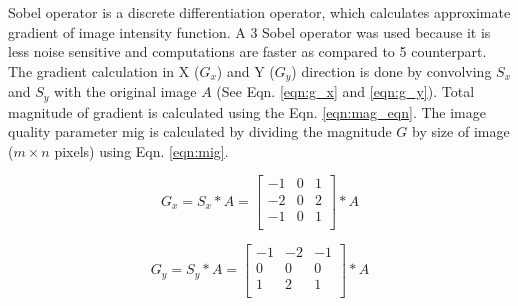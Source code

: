             \vspace{5mm}
            \noindent Sobel operator is a discrete differentiation operator, which calculates approximate gradient of image intensity function. A 3  Sobel operator was used because it is less noise sensitive and computations are faster as compared to 5  counterpart. The gradient calculation in X ($G_x$) and Y ($G_y$) direction is done by convolving $S_x$ and $S_y$ with the original image $A$ (See Eqn. \ref{eqn:g_x} and \ref{eqn:g_y}). Total magnitude of gradient is calculated using the Eqn. \ref{eqn:mag_eqn}. The image quality parameter \gls{mig} is calculated by dividing the magnitude $G$ by size of image (\( m \times n\) pixels) using Eqn. \ref{eqn:mig}. 
            

            \begin{equation}
                G_x = S_x * A = 
                \begin{bmatrix}
                    -1 & 0 & 1 \\
                    -2 & 0 & 2 \\
                    -1 & 0 & 1 \\
                \end{bmatrix} * A
                \label{eqn:g_x}
            \end{equation}

            \begin{equation}
                G_y = S_y * A = 
                \begin{bmatrix}
                    -1 & -2 & -1 \\
                    0 & 0 & 0 \\
                    1 & 2 & 1 \\
                \end{bmatrix} * A
                \label{eqn:g_y}
            \end{equation}

